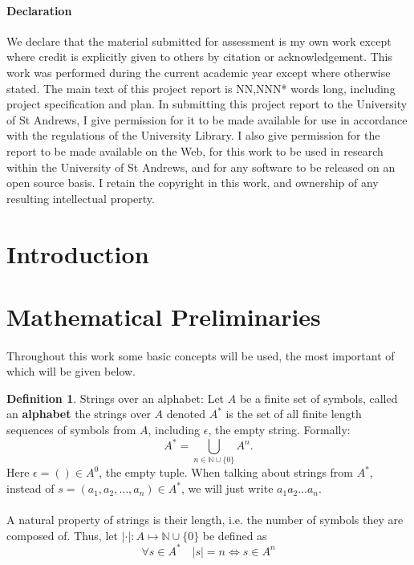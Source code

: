 \documentclass{article}
\theoremstyle{definition}
\newtheorem{definition}{Definition}[section]
\newcommand{\Nat}{\mathbb{N}}
\begin{document}
\paragraph{Declaration}
We declare that the material submitted for assessment is my own work except where credit is explicitly given to others by citation or acknowledgement. This work was performed during the current academic year except where otherwise stated. The main text of this project report is NN,NNN* words long, including project specification and plan. In submitting this project report to the University of St Andrews, I give permission for it to be made available for use in accordance with the regulations of the University Library. I also give permission for the report to be made available on the Web, for this work to be used in research within the University of St Andrews, and for any software to be released on an open source basis. I retain the copyright in this work, and ownership of any resulting intellectual property.

\newpage

\tableofcontents

\newpage


\section{Introduction}
\section{Mathematical Preliminaries}
\paragraph{}
Throughout this work some basic concepts will be used, the most important of
which will be given below.
\begin{definition}{Strings over an alphabet:}
  Let $A$ be a finite set of symbols, called an \textbf{alphabet} the strings
  over $A$ denoted $A^*$ is the set of all finite length sequences of
  symbols from $A$, including $\epsilon$, the empty string. Formally:
  \[
    A^* = \bigcup_{n\in \Nat \cup \{0\}} A^n.
  \]
  Here $\epsilon = () \in A^0$, the empty tuple. When talking about strings from $A^*$, instead of $s = (a_1, a_2, \hdots, a_n)
  \in A^*$, we will just write $a_1a_2\hdots a_n$.
\end{definition}
\paragraph{}
A natural property of strings is their length, i.e. the number of symbols they
are composed of. Thus, let $|\cdot| : A
\mapsto \Nat \cup \{0\}$ be defined as
\[
  \forall s \in A^* \quad |s| = n \Leftrightarrow s \in A^n
\]
\end{document}

